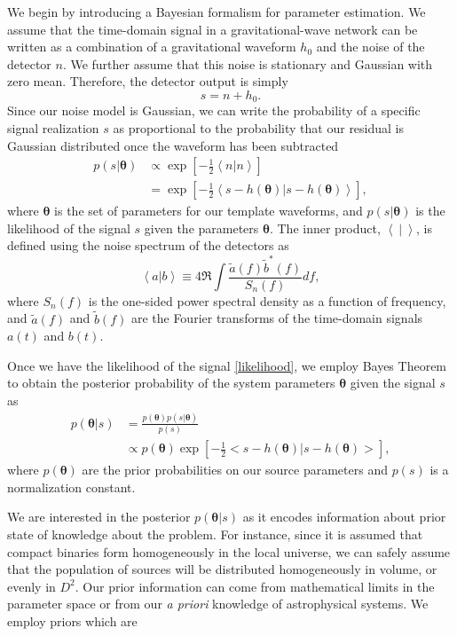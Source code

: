 \documentclass[11pt,a4paper]{emulateapj}
\newcommand{\thpara}{\boldsymbol{\theta}}
\begin{document}
We begin by introducing a Bayesian formalism for parameter estimation. 
We assume that the time-domain signal in a gravitational-wave
network can be written as a combination of a gravitational
waveform $h_0$ and the noise of the detector $n$.  We further assume
that this noise is stationary and Gaussian with zero mean.  Therefore,
the detector output is simply
\begin{equation}
s = n + h_0 .
\label{SignalAddition}
\end{equation}
Since our noise model is Gaussian, we can write the
probability of a specific signal realization $s$ as proportional to the probability
that our residual is Gaussian distributed once the waveform has been subtracted
\begin{align}
  p(s | \thpara) &\propto \exp\left[-\frac{1}{2}\left<n|n
    \right>\right] \nonumber \\ &= \exp\left[-\frac{1}{2}\left < s -
    h(\thpara) | s-h(\thpara)\right >\right] ,
  \label{likelihood}
\end{align}
where $\thpara$ is the set of parameters for our template
waveforms, and $p(s | \thpara)$ is the likelihood of the signal $s$ given the parameters $\thpara$.
  The inner product, $\left< ~|~ \right> $, is defined using the noise
spectrum of the detectors as
\begin{equation}
  \left<a|b\right> \equiv 4 \Re \int \frac{\tilde{a}(f)\tilde{b}^*(f)}{S_n(f)} df ,
  \label{innerProduct}
\end{equation}
where $S_n(f)$ is the one-sided power spectral density as a function
of frequency, and $\tilde{a}(f)$ and $\tilde{b}(f)$ are the Fourier
transforms of the time-domain signals $a(t)$ and $b(t)$.
 
Once we have the likelihood of the signal \eqref{likelihood}, we
employ Bayes Theorem to obtain the posterior probability of the system
parameters $\thpara$ given the signal $s$ as
\begin{align}
  p(\thpara | s) &= \frac{p(\thpara)p(s | \thpara)}{p(s)} \nonumber\\
  & \propto p(\thpara) \exp\left[-\frac{1}{2}\big < s - h(\thpara) | s-h(\thpara) \big > \right] ,
  \label{posterior}
\end{align}
where $p(\thpara)$ are the prior probabilities on our
source parameters and $p(s)$ is a normalization constant.

We are interested in the posterior $p(\thpara | s)$ as it encodes information about
prior state of knowledge about the problem.  For instance, since it is assumed that compact binaries
form homogeneously in the local universe, we can safely assume that the population of
sources will be distributed homogeneously in volume, or evenly in $D^2$. 
 Our prior information can come from mathematical limits in the parameter space or
from our \textit{a priori} knowledge of astrophysical systems.  We employ priors which are
\end{document}

